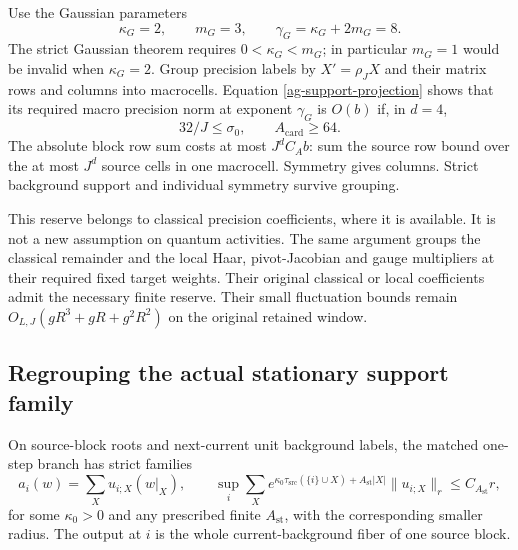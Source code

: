 \documentclass[11pt]{article}
\theoremstyle{remark}
\begin{document}
Use the Gaussian parameters
\begin{equation}\label{ag-Gaussian-exponents}
 \kappa_G=2,\qquad m_G=3,\qquad
 \gamma_G=\kappa_G+2m_G=8.
\end{equation}
The strict Gaussian theorem requires $0<\kappa_G<m_G$;
in particular $m_G=1$ would be invalid when $\kappa_G=2$.
Group precision labels by $X'=\rho_JX$ and their matrix
rows and columns into macrocells. Equation
\eqref{ag-support-projection} shows that its required macro
precision norm at exponent $\gamma_G$ is $O(b)$ if, in $d=4$,
\begin{equation}\label{ag-precision-budget}
 32/J\le\sigma_0,\qquad A_{\mathrm{card}}\ge64.
\end{equation}
The absolute block row sum costs at most $J^d C_A b$:
sum the source row bound over the at most $J^d$ source cells
in one macrocell. Symmetry gives columns. Strict background
support and individual symmetry survive grouping.

This reserve belongs to classical precision coefficients,
where it is available. It is not a new assumption on quantum
activities. The same argument groups the classical remainder
and the local Haar, pivot-Jacobian and gauge multipliers at
their required fixed target weights. Their original classical
or local coefficients admit the necessary finite reserve.
Their small fluctuation bounds remain
$O_{L,J}(gR^3+gR+g^2R^2)$ on the original retained window.

\subsection{Regrouping the actual stationary support family}

On source-block roots and next-current unit background labels,
the matched one-step branch has strict families
\begin{equation}\label{ag-source-stationary}
 a_i(w)=\sum_Xu_{i;X}(w|_X),\qquad
 \sup_i\sum_Xe^{\kappa_0\tau_{\mathrm{src}}(\{i\}\cup X)
                       +A_{\mathrm{st}}|X|}
                  \|u_{i;X}\|_r\le C_{A_{\mathrm{st}}}r,
\end{equation}
for some $\kappa_0>0$ and any prescribed finite
$A_{\mathrm{st}}$, with the corresponding smaller radius.
The output at $i$ is the whole current-background fiber of
one source block.
\end{document}
